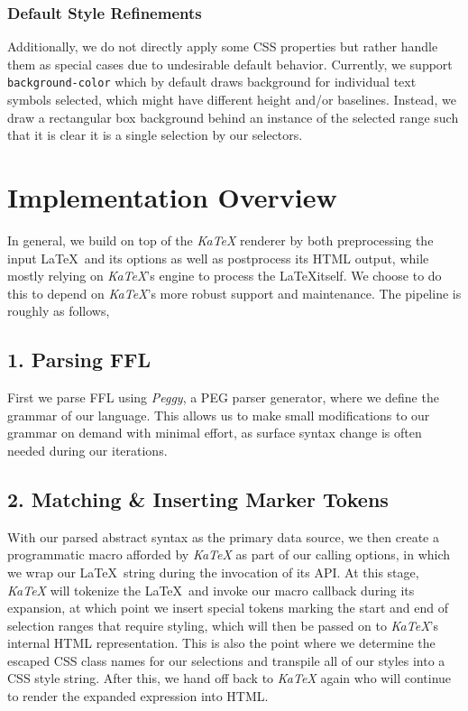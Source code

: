 \documentclass{article}
\begin{document}
\begin{multicols*}{2}
  \subsubsection*{Default Style Refinements}
  Additionally, we do not directly apply some CSS properties but rather handle them
  as special cases due to undesirable default behavior.
  Currently, we support \texttt{background-color} which by default draws background
  for individual text symbols selected, which might have different height and/or baselines.
  Instead, we draw a rectangular box background behind an instance of the selected range
  such that it is clear it is a single selection by our selectors.
  \section*{Implementation Overview}
  In general, we build on top of the \textit{KaTeX} renderer by both preprocessing
  the input \LaTeX\ and its options as well as postprocess its HTML output, while
  mostly relying on \textit{KaTeX}'s engine to process the \LaTeX itself. We choose
  to do this to depend on \textit{KaTeX}'s more robust support and maintenance.
  The pipeline is roughly as follows,
  \subsection*{1. Parsing FFL}
  First we parse FFL using \textit{Peggy}\cite{Peggy}, a PEG parser generator,
  where we define the grammar of our language.
  This allows us to make small modifications to our grammar on demand with minimal effort,
  as surface syntax change is often needed during our iterations.
  \subsection*{2. Matching \& Inserting Marker Tokens}
  With our parsed abstract syntax as the primary data source, we then create a programmatic
  macro afforded by \textit{KaTeX} as part of our calling options, in which we wrap our \LaTeX\
  string during the invocation of its API. At this stage, \textit{KaTeX} will tokenize
  the \LaTeX\ and invoke our macro callback during its expansion, at which point we insert
  special tokens marking the start and end of selection ranges that require styling, which
  will then be passed on to \textit{KaTeX}'s internal HTML representation.
  This is also the point where we determine the escaped CSS class names for our selections
  and transpile all of our styles into a CSS style string.
  After this, we hand off back to \textit{KaTeX} again who will continue to render the
  expanded expression into HTML.

\end{multicols*}
\end{document}

